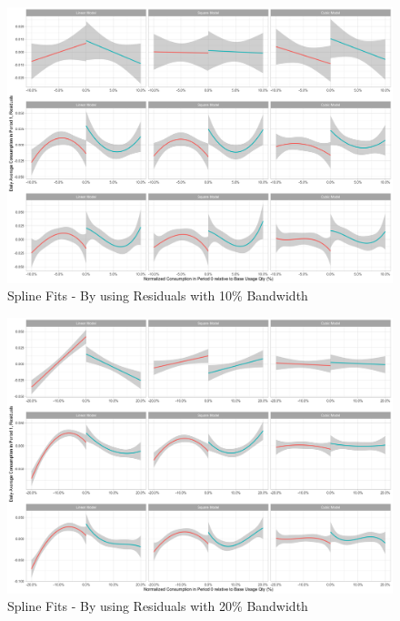 \begin{figure}
    \centering
    \includegraphics[scale = 0.085]{02_Plots/SMUD-Billing-Data_RD-Approach_Residuals_BW-10}
    \caption{Spline Fits - By using Residuals with 10\% Bandwidth}
    \label{Figure:Residuals_10P}
\end{figure}

\clearpage
\begin{figure}
    \centering
    \includegraphics[scale = 0.085]{02_Plots/SMUD-Billing-Data_RD-Approach_Residuals_BW-20}
    \caption{Spline Fits - By using Residuals with 20\% Bandwidth}
    \label{Figure:Residuals_20P}
\end{figure}

